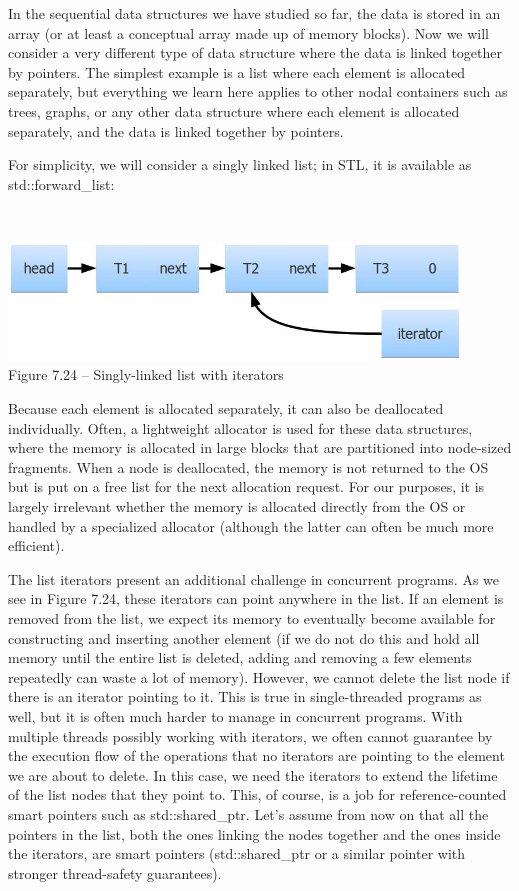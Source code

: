 
In the sequential data structures we have studied so far, the data is stored in an array (or at least a conceptual array made up of memory blocks). Now we will consider a very different type of data structure where the data is linked together by pointers. The simplest example is a list where each element is allocated separately, but everything we learn here applies to other nodal containers such as trees, graphs, or any other data structure where each element is allocated separately, and the data is linked together by pointers.

For simplicity, we will consider a singly linked list; in STL, it is available as std::forward\_list:

\hspace*{\fill} \\ %
\begin{center}
\includegraphics[width=0.9\textwidth]{content/2/chapter7/images/24.jpg}\\
Figure 7.24 – Singly-linked list with iterators
\end{center}

Because each element is allocated separately, it can also be deallocated individually. Often, a lightweight allocator is used for these data structures, where the memory is allocated in large blocks that are partitioned into node-sized fragments. When a node is deallocated, the memory is not returned to the OS but is put on a free list for the next allocation request. For our purposes, it is largely irrelevant whether the memory is allocated directly from the OS or handled by a specialized allocator (although the latter can often be much more efficient).

The list iterators present an additional challenge in concurrent programs. As we see in Figure 7.24, these iterators can point anywhere in the list. If an element is removed from the list, we expect its memory to eventually become available for constructing and inserting another element (if we do not do this and hold all memory until the entire list is deleted, adding and removing a few elements repeatedly can waste a lot of memory). However, we cannot delete the list node if there is an iterator pointing to it. This is true in single-threaded programs as well, but it is often much harder to manage in concurrent programs. With multiple threads possibly working with iterators, we often cannot guarantee by the execution flow of the operations that no iterators are pointing to the element we are about to delete. In this case, we need the iterators to extend the lifetime of the list nodes that they point to. This, of course, is a job for reference-counted smart pointers such as std::shared\_ptr. Let's assume from now on that all the pointers in the list, both the ones linking the nodes together and the ones inside the iterators, are smart pointers (std::shared\_ptr or a similar pointer with stronger thread-safety 
guarantees).

